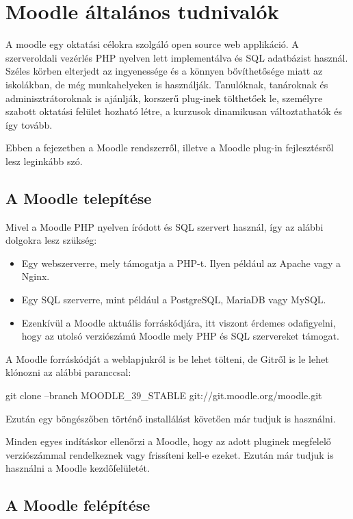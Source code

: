 \chapter{Moodle általános tudnivalók}

A moodle egy oktatási célokra szolgáló open source web applikáció. A szerveroldali vezérlés PHP nyelven lett implementálva és SQL adatbázist használ. Széles körben elterjedt az ingyenessége és a könnyen bővíthetősége miatt az iskolákban, de még munkahelyeken is használják. Tanulóknak, tanároknak és adminisztrátoroknak is ajánlják, korszerű plug-inek tölthetőek le, személyre szabott oktatási felület hozható létre, a kurzusok dinamikusan változtathatók és így tovább. \par
Ebben a fejezetben a Moodle rendszerről, illetve a Moodle plug-in fejlesztésről lesz leginkább szó.

\section{A Moodle telepítése}

Mivel a Moodle PHP nyelven íródott és SQL szervert használ, így az alábbi dolgokra lesz szükség:
\begin{itemize}
    \item Egy webszerverre, mely támogatja a PHP-t. Ilyen például az Apache vagy a Nginx.
    \item Egy SQL szerverre, mint például a PostgreSQL, MariaDB vagy MySQL.
    \item Ezenkívül a Moodle aktuális forráskódjára, itt viszont érdemes odafigyelni, hogy az utolsó verziószámú Moodle mely PHP és SQL szervereket támogat.
\end{itemize}

A Moodle forráskódját a weblapjukról is be lehet tölteni, de Gitről is le lehet klónozni az alábbi paranccsal:

\begin{center}
git clone --branch MOODLE\_39\_STABLE git://git.moodle.org/moodle.git
\end{center}

Ezután egy böngészőben történő installálást követően már tudjuk is használni.\par
Minden egyes indításkor ellenőrzi a Moodle, hogy az adott pluginek megfelelő verziószámmal rendelkeznek vagy frissíteni kell-e ezeket. Ezután már tudjuk is használni a Moodle kezdőfelületét.

\section{A Moodle felépítése}

